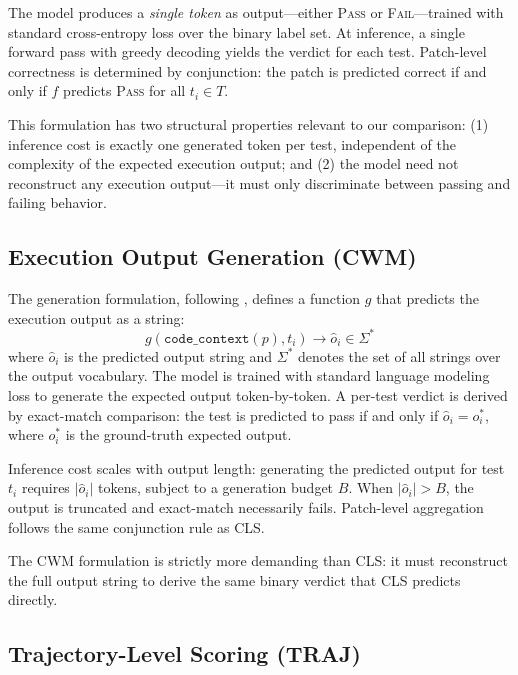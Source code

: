 The model produces a \emph{single token} as output---either \textsc{Pass} or \textsc{Fail}---trained with standard cross-entropy loss over the binary label set. At inference, a single forward pass with greedy decoding yields the verdict for each test. Patch-level correctness is determined by conjunction: the patch is predicted correct if and only if $f$ predicts \textsc{Pass} for all $t_i \in T$.

This formulation has two structural properties relevant to our comparison: (1) inference cost is exactly one generated token per test, independent of the complexity of the expected execution output; and (2) the model need not reconstruct any execution output---it must only discriminate between passing and failing behavior.

\subsection{Execution Output Generation (CWM)}
\label{ssec:cwm}

The generation formulation, following \citet{meta2025cwm}, defines a function $g$ that predicts the execution output as a string:
\begin{equation}
    g(\texttt{code\_context}(p), t_i) \rightarrow \hat{o}_i \in \Sigma^*
    \label{eq:cwm}
\end{equation}
where $\hat{o}_i$ is the predicted output string and $\Sigma^*$ denotes the set of all strings over the output vocabulary. The model is trained with standard language modeling loss to generate the expected output token-by-token. A per-test verdict is derived by exact-match comparison: the test is predicted to pass if and only if $\hat{o}_i = o_i^*$, where $o_i^*$ is the ground-truth expected output.

Inference cost scales with output length: generating the predicted output for test $t_i$ requires $|\hat{o}_i|$ tokens, subject to a generation budget $B$. When $|\hat{o}_i| > B$, the output is truncated and exact-match necessarily fails. Patch-level aggregation follows the same conjunction rule as CLS.

The CWM formulation is strictly more demanding than CLS: it must reconstruct the full output string to derive the same binary verdict that CLS predicts directly.

\subsection{Trajectory-Level Scoring (TRAJ)}
\label{ssec:traj}

